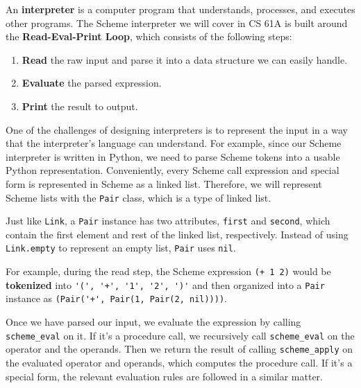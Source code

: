 An \textbf{interpreter} is a computer program that understands, processes, and executes other programs. The Scheme interpreter we will cover in CS 61A is built around the \textbf{Read-Eval-Print Loop}, which consists of the following steps:
\begin{enumerate}
    \item \textbf{Read} the raw input and parse it into a data structure we can easily handle. 
    \item \textbf{Evaluate} the parsed expression. 
    \item \textbf{Print} the result to output. 
\end{enumerate}

One of the challenges of designing interpreters is to represent the input in a way that the interpreter's language can understand.
For example, since our Scheme interpreter is written in Python, we need to parse Scheme tokens into a usable Python representation.
Conveniently, every Scheme call expression and special form is represented in Scheme as a linked list. 
Therefore, we will represent Scheme lists with the \lstinline{Pair} class, which is a type of linked list. 

Just like \lstinline{Link}, a \lstinline{Pair} instance has two attributes, \lstinline{first} and \lstinline{second}, which contain the first element and rest of the linked list, respectively. Instead of using \lstinline{Link.empty} to represent an empty list, \lstinline{Pair} uses \lstinline{nil}.

For example, during the read step, the Scheme expression \lstinline{(+ 1 2)} would be \textbf{tokenized} into \lstinline{'(', '+', '1', '2', ')'} and then organized into a \lstinline{Pair} instance as \lstinline{(Pair('+', Pair(1, Pair(2, nil))))}. 

Once we have parsed our input, we evaluate the expression by calling \lstinline{scheme_eval} on it. If it's a procedure call, we recursively call \lstinline{scheme_eval} on the operator and the operands. Then we return the result of calling \lstinline{scheme_apply} on the evaluated operator and operands, which computes the procedure call. If it's a special form, the relevant evaluation rules are followed in a similar matter.


